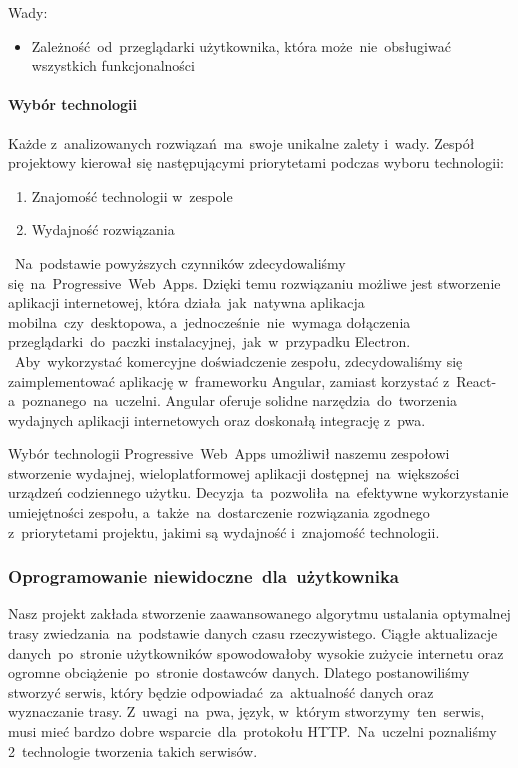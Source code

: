 Wady:
\begin{itemize}
    \item Zależność~od~przeglądarki użytkownika, która może~nie~obsługiwać wszystkich funkcjonalności
\end{itemize}

\paragraph{Wybór technologii}
Każde z~analizowanych rozwiązań~ma~swoje unikalne zalety i~wady.
Zespół projektowy kierował się następującymi priorytetami podczas wyboru technologii:

\begin{enumerate}
    \item Znajomość technologii w~zespole
    \item Wydajność rozwiązania
\end{enumerate}
~Na~podstawie powyższych czynników zdecydowaliśmy się~na~Progressive~Web~Apps.
Dzięki temu rozwiązaniu możliwe jest stworzenie aplikacji internetowej, która działa~jak~natywna aplikacja mobilna~czy~desktopowa, a~jednocześnie~nie~wymaga dołączenia przeglądarki~do~paczki instalacyjnej,~jak~w~przypadku Electron.
~Aby~wykorzystać komercyjne doświadczenie zespołu, zdecydowaliśmy się zaimplementować aplikację w~frameworku Angular, zamiast korzystać z~React-a~poznanego~na~uczelni.
Angular oferuje solidne narzędzia~do~tworzenia wydajnych aplikacji internetowych oraz doskonałą integrację z~\acrshort{pwa}.

Wybór technologii Progressive~Web~Apps umożliwił naszemu zespołowi stworzenie wydajnej, wieloplatformowej aplikacji dostępnej~na~większości urządzeń codziennego użytku.
Decyzja~ta~pozwoliła~na~efektywne wykorzystanie umiejętności zespołu, a~także~na~dostarczenie rozwiązania zgodnego z~priorytetami projektu, jakimi są wydajność i~znajomość technologii.

\subsubsection{Oprogramowanie niewidoczne~dla~użytkownika}
Nasz projekt zakłada stworzenie zaawansowanego algorytmu ustalania optymalnej trasy zwiedzania~na~podstawie danych czasu rzeczywistego.
Ciągłe aktualizacje danych~po~stronie użytkowników spowodowałoby wysokie zużycie internetu oraz ogromne obciążenie~po~stronie dostawców danych.
Dlatego postanowiliśmy stworzyć serwis, który będzie odpowiadać~za~aktualność danych oraz wyznaczanie trasy.
Z~uwagi~na~\acrshort{pwa}, język, w~którym stworzymy~ten~serwis, musi mieć bardzo dobre wsparcie~dla~protokołu HTTP\@.~Na~uczelni poznaliśmy 2~technologie tworzenia takich serwisów.

